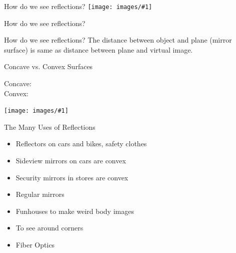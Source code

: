 \documentclass[t]{beamer}
\newcommand{\imgs}[1]{\texttt{[image: images/\#1]}}
\newcommand{\bi}{\begin{itemize}}
\newcommand{\ei}{\end{itemize}}
\begin{document}
\begin{frame}{How do we see reflections?}
\imgs{mirror.jpg}
\end{frame}

\begin{frame}{How do we see reflections?}
\end{frame}


\begin{frame}{How do we see reflections?}
The distance between object and plane (mirror surface) is same as distance between plane and virtual image.
\end{frame}

\begin{frame}{Concave vs. Convex Surfaces}
\begin{description}
\item[Concave:] 
\item[Convex:] 
\end{description}
\imgs{spoon.jpg}
\end{frame}

\begin{frame}{The Many Uses of Reflections}
\bi
\item Reflectors on cars and bikes, safety clothes
\item Sideview mirrors on cars are convex
\item Security mirrors in stores are convex
\item Regular mirrors
\item Funhouses to make weird body images
\item To see around corners
\item Fiber Optics
\ei
\end{frame}
\end{document}
